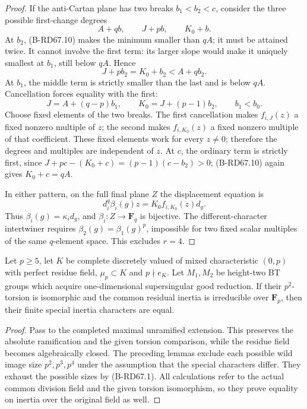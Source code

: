 \begin{proof}
If the anti-Cartan plane has two breaks \(b_1<b_2<c\),
consider the three possible first-change degrees
\[
 A+qb,\qquad J+pb,\qquad K_0+b.
 \tag{B-RD67.14}
\]
At \(b_2\), (B-RD67.10) makes the minimum smaller than \(qA\);
it must be attained twice. It cannot involve the first term:
its larger slope would make it uniquely smallest at \(b_1\),
still below \(qA\). Hence
\[
 J+pb_2=K_0+b_2<A+qb_2.
 \tag{B-RD67.15}
\]
At \(b_1\), the middle term is strictly smaller than the last
and is below \(qA\). Cancellation forces equality with the first:
\[
 J=A+(q-p)b_1,\qquad
 K_0=J+(p-1)b_2,\qquad b_1<b_0.
 \tag{B-RD67.16}
\]
Choose fixed elements of the two breaks. The first cancellation
makes \(f_{i,J}(z)\) a fixed nonzero multiple of \(z\);
the second makes \(f_{i,K_0}(z)\) a fixed nonzero multiple
of that coefficient. These fixed elements work for every
\(z\ne0\); therefore the degrees and multiples are independent
of \(z\). At \(c\), the ordinary term is strictly first, since
\(J+pc-(K_0+c)=(p-1)(c-b_2)>0\); (B-RD67.10) again gives
\(K_0+c=qA\).

In either pattern, on the full final plane \(Z\) the displacement
equation is
\[
 d_i^q\beta_i(g)z=K_0 f_{i,K_0}(z)d_g .
 \tag{B-RD67.17}
\]
Thus \(\beta_i(g)=\kappa_i d_g\), and
\(\beta_i:Z\to\mathbf F_q\) is bijective.
The different-character intertwiner requires
\(\beta_2(g)=\beta_1(g)^p\), impossible for two fixed scalar
multiples of the same \(q\)-element space. This excludes \(r=4\).
\end{proof}

\begin{theorem}
\label{thm:B-RD67}
Let \(p\ge5\), let \(K\) be complete discretely valued of mixed
characteristic \((0,p)\) with perfect residue field, \(\mu_p\subset K\)
and \(p\nmid e_K\). Let \(M_1,M_2\) be height-two BT groups
which acquire one-dimensional supersingular good reduction.
If their \(p^2\)-torsion is isomorphic and the common residual
inertia is irreducible over \(\mathbf F_p\), then their finite
special inertia characters are equal.
\end{theorem}
\begin{proof}
Pass to the completed maximal unramified extension. This preserves
the absolute ramification and the given torsion comparison, while
the residue field becomes algebraically closed. The preceding
lemmas exclude each possible wild image size \(p^2,p^3,p^4\)
under the assumption that the special characters differ.
They exhaust the possible sizes by (B-RD67.1). All calculations
refer to the actual common division field and the given torsion
isomorphism, so they prove equality on inertia over the original
field as well.
\end{proof}

